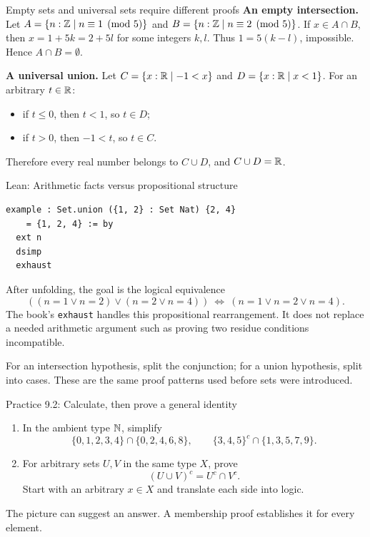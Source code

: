 \begin{frame}{Empty sets and universal sets require different proofs}
\textbf{An empty intersection.} Let
$A=\{n:\mathbb{Z}\mid n\equiv1\pmod5\}$ and
$B=\{n:\mathbb{Z}\mid n\equiv2\pmod5\}$.
If $x\in A\cap B$, then $x=1+5k=2+5l$ for some integers $k,l$.
Thus $1=5(k-l)$, impossible. Hence $A\cap B=\emptyset$.
\medskip

\textbf{A universal union.} Let $C=\{x:\mathbb{R}\mid-1<x\}$ and
$D=\{x:\mathbb{R}\mid x<1\}$. For an arbitrary $t\in\mathbb{R}$:
\begin{itemize}
\item if $t\le0$, then $t<1$, so $t\in D$;
\item if $t>0$, then $-1<t$, so $t\in C$.
\end{itemize}
Therefore every real number belongs to $C\cup D$, and $C\cup D=\mathbb{R}$.
\end{frame}

\begin{frame}[fragile]{Lean: Arithmetic facts versus propositional structure}
\begin{lstlisting}
example : Set.union ({1, 2} : Set Nat) {2, 4}
    = {1, 2, 4} := by
  ext n
  dsimp
  exhaust
\end{lstlisting}
After unfolding, the goal is the logical equivalence
\[
 ((n=1\lor n=2)\lor(n=2\lor n=4))
 \ \Longleftrightarrow\ (n=1\lor n=2\lor n=4).
\]
The book's \texttt{exhaust} handles this propositional rearrangement.
It does not replace a needed arithmetic argument such as proving two residue conditions incompatible.
\medskip

For an intersection hypothesis, split the conjunction; for a union hypothesis,
split into cases. These are the same proof patterns used before sets were introduced.
\end{frame}

\begin{frame}{Practice 9.2: Calculate, then prove a general identity}
\begin{enumerate}
\item In the ambient type $\mathbb{N}$, simplify
\[
 \{0,1,2,3,4\}\cap\{0,2,4,6,8\},\qquad
 \{3,4,5\}^c\cap\{1,3,5,7,9\}.
\]
\item For arbitrary sets $U,V$ in the same type $X$, prove
\[
 (U\cup V)^c=U^c\cap V^c.
\]
Start with an arbitrary $x\in X$ and translate each side into logic.
\end{enumerate}
The picture can suggest an answer. A membership proof establishes it for every element.
\end{frame}

